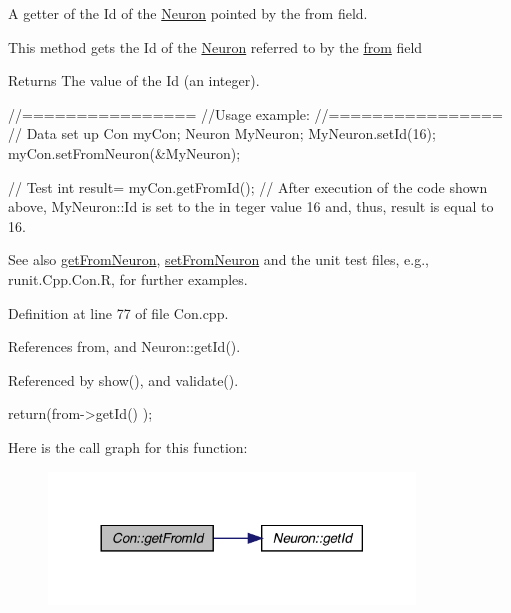 A getter of the Id of the \hyperlink{class_neuron}{Neuron} pointed by the from field. 

This method gets the Id of the \hyperlink{class_neuron}{Neuron} referred to by the \hyperlink{class_con_a40215fdb25f3b2ed66e965df558e86e2}{from} field \begin{DoxyReturn}{Returns}
The value of the Id (an integer).
\end{DoxyReturn}

\begin{DoxyCode}
        //================
        //Usage example:
        //================
        // Data set up
                Con myCon;
                Neuron MyNeuron;
                MyNeuron.setId(16);
                myCon.setFromNeuron(&MyNeuron);

        // Test
                int result= myCon.getFromId();
        // After execution of the code shown above, MyNeuron::Id is set to the in
      teger value 16 and, thus, result is equal to 16.
\end{DoxyCode}


\begin{DoxySeeAlso}{See also}
\hyperlink{class_con_a970a74ffcba9433d6f383ecab398f25f}{getFromNeuron}, \hyperlink{class_con_a19ca0a1d257a3f002693a441db03aeb4}{setFromNeuron} and the unit test files, e.g., runit.Cpp.Con.R, for further examples. 
\end{DoxySeeAlso}


Definition at line 77 of file Con.cpp.



References from, and Neuron::getId().



Referenced by show(), and validate().


\begin{DoxyCode}
                    {
        return(from->getId() );
}
\end{DoxyCode}


Here is the call graph for this function:\nopagebreak
\begin{figure}[H]
\begin{center}
\leavevmode
\includegraphics[width=276pt]{class_con_aad72314592bebdcae6c68a67d2b4a505_cgraph}
\end{center}
\end{figure}




